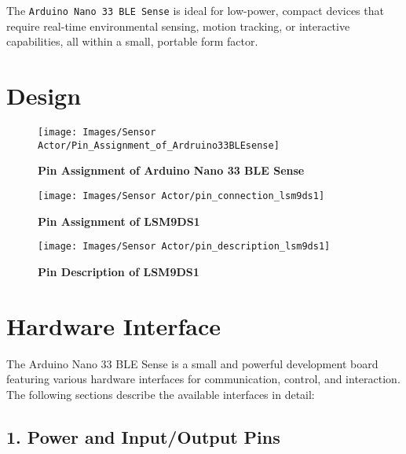 	The \texttt{Arduino Nano 33 BLE Sense} is ideal for low-power, compact devices that require real-time environmental sensing, motion tracking, or interactive capabilities, all within a small, portable form factor.\cite{Passaro:2017}
	

\section{Design}

\begin{figure}[H]\centering
	\texttt{[image: Images/Sensor Actor/Pin\_Assignment\_of\_Ardruino33BLEsense]} 
	\caption{\textbf{Pin Assignment of Arduino Nano 33 BLE Sense}}
	\label{fig:Pin_assignment_of_Arduino_Nano_33_BLE_Sense} 
\end{figure}
\begin{figure}[H]\centering
	\texttt{[image: Images/Sensor Actor/pin\_connection\_lsm9ds1]} 
	\caption{\textbf{Pin Assignment of LSM9DS1}}
	\label{fig:Pin_assignment_of_Arduino_Nano_33_BLE_Sense} 
\end{figure}
\begin{figure}[H]\centering
	\texttt{[image: Images/Sensor Actor/pin\_description\_lsm9ds1]} 
	\caption{\textbf{Pin Description of LSM9DS1}}
	\label{fig:Pin_assignment_of_Arduino_Nano_33_BLE_Sense} 
\end{figure}
\section{Hardware Interface}

	The Arduino Nano 33 BLE Sense is a small and powerful development board featuring various hardware interfaces for communication, control, and interaction. The following sections describe the available interfaces in detail:
	
	\subsection*{1. Power and Input/Output Pins}
	
